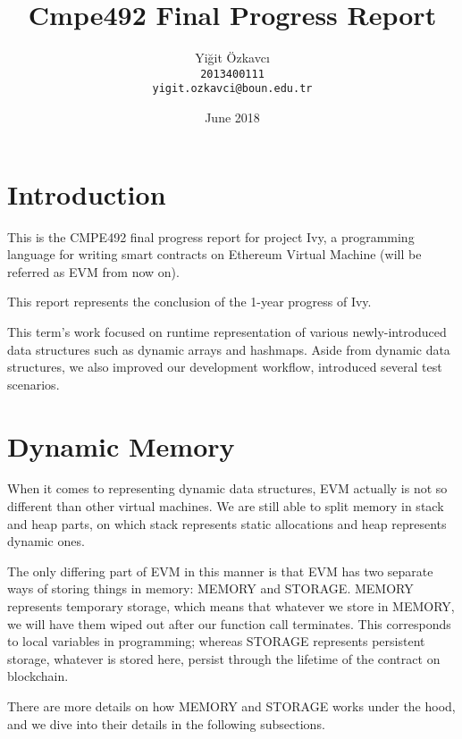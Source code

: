 \documentclass{article}
\title{Cmpe492 Final Progress Report}
\author{
  Yiğit Özkavcı \\
  \texttt{2013400111} \\
  \texttt{yigit.ozkavci@boun.edu.tr}
}
\date{June 2018}
\begin{document}

\maketitle

\tableofcontents

\newpage

\section{Introduction}
\par 
\par This is the CMPE492 final progress report for project Ivy, a programming language for writing smart contracts on Ethereum Virtual Machine (will be referred as EVM from now on).
\par This report represents the conclusion of the 1-year progress of Ivy.

\par This term's work focused on runtime representation of various newly-introduced data structures such as dynamic arrays and hashmaps. Aside from dynamic data structures, we also improved our development workflow, introduced several test scenarios.

\section{Dynamic Memory}
When it comes to representing dynamic data structures, EVM actually is not so different than other virtual machines. We are still able to split memory in stack and heap parts, on which stack represents static allocations and heap represents dynamic ones.
\par The only differing part of EVM in this manner is that EVM has two separate ways of storing things in memory: MEMORY and STORAGE. MEMORY represents temporary storage, which means that whatever we store in MEMORY, we will have them wiped out after our function call terminates. This corresponds to local variables in programming; whereas STORAGE represents persistent storage, whatever is stored here, persist through the lifetime of the contract on blockchain.
\par There are more details on how MEMORY and STORAGE works under the hood, and we dive into their details in the following subsections.
\end{document}
